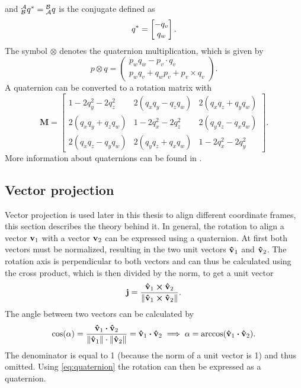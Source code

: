 and $\qtf{a}{b}^* = \qtf{b}{a}$ is the conjugate defined as
\begin{equation}
	\qtf{}{}^* = \begin{bmatrix}
		-q_v \\
		q_w
	\end{bmatrix}.
\end{equation}
The symbol $\otimes$ denotes the quaternion multiplication, which is given by
\begin{equation}
	p \otimes q=\left(\begin{array}{c}
			p_{w} q_{w}-p_v \cdot q_v \\
			p_{w} q_v+q_{w} p_v+p_v \times q_v
		\end{array}\right).
\end{equation}
A quaternion can be converted to a rotation matrix with
\begin{equation}
	\label{eq:q_to_M}
	\mathbf{M} =
	\left[
		\begin{array}{ccc}
			1 - 2q_y^2-2 q_z^2   & 2(q_x q_y- q_z q_w) & 2(q_x q_z + q_y q_w) \\
			2(q_x q_y + q_z q_w) & 1-2 q_x^2-2 q_z^2   & 2(q_y q_z -q_x q_w)  \\
			2(q_x q_z-q_y q_w)   & 2(q_y q_z+ q_x q_w) & 1 - 2 q_x^2- 2 q_y^2
		\end{array}
		\right].
\end{equation}
More information about quaternions can be found in \cite{Kok2017,Trawny2005}.\\

\subsection{Vector projection}
\label{subsec:vector_projection}
Vector projection is used later in this thesis to align different coordinate frames, this section describes the theory behind it.
In general, the rotation to align a vector $\vb{v}_1$ with a vector $\vb{v}_2$ can be expressed using a quaternion.
At first both vectors must be normalized, resulting in the two unit vectors $\vu{v}_1$ and $\vu{v}_2$.
The rotation axis is perpendicular to both vectors and can thus be calculated using the cross product, which is then divided by the norm, to get a unit vector
\begin{equation}
	\vb{j} = \frac{\vu{v}_1 \cp \vu{v}_2}{\norm{\vu{v}_1 \cp \vu{v}_2}}.
\end{equation}
The angle between two vectors can be calculated by
\begin{equation}
	\cos(\alpha) = \frac{\vu{v}_1 \vdot \vu{v}_2}{\norm{\vu{v}_1} \cdot \norm{\vu{v}_2}}
	= \vu{v}_1 \vdot \vu{v}_2 \implies
	\alpha = \arccos(\vu{v}_1 \vdot \vu{v}_2).
\end{equation}
The denominator is equal to 1 (because the norm of a unit vector is 1) and thus omitted.
Using \cref{eq:quaternion} the rotation can then be expressed as a quaternion.



